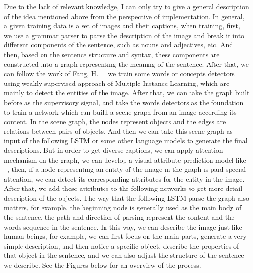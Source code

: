 \documentclass[12pt]{article}
\begin{document}
	Due to the lack of relevant knowledge, I can only try to give a general description of the idea mentioned above from the perspective of implementation. In general, a given training data is a set of images and their captions, when training, first, we use a grammar parser to parse the description of the image and break it into different components of the sentence, such as nouns and adjectives, etc. And then, based on the sentence structure and syntax, these components are constructed into a graph representing the meaning of the sentence. After that, we can follow the work of Fang, H. ~\cite{fang2015captions}, we train some words or concepts detectors using weakly-supervised approach of Multiple Instance Learning, which are mainly to detect the entities of the image. After that, we can take the graph built before as the supervisory signal, and take the words detectors as the foundation to train a network which can build a scene graph from an image according its content. In the scene graph, the nodes represent objects and the edges are relations between pairs of objects. And then we can take this scene graph as input of the following LSTM or some other language models to generate the final descriptions. But in order to get diverse captions, we can apply attention mechanism on the graph, we can develop a visual attribute prediction model like ~\cite{you2016image}, then, if a node representing an entity of the image in the graph is paid special attention, we can detect its corresponding attributes for the entity in the image. After that, we add these attributes to the following networks to get more detail description of the objects. The way that the following LSTM parse the graph also matters, for example, the beginning node is generally used as the main body of the sentence, the path and direction of parsing represent the content and the words sequence in the sentence. In this way, we can describe the image just like human beings, for example, we can first focus on the main parts, generate a very simple description, and then notice a specific object, describe the properties of that object in the sentence, and we can also adjust the structure of the sentence we describe. See the Figures below for an overview of the process.
	
\end{document}
